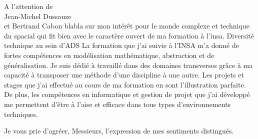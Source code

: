 \documentclass[12pt]{lettre}
\begin{document}
\begin{letter}{A l'attention de\\Jean-Michel Dussauze\\et Bertrand Cabon}
blabla sur mon intérêt pour le monde complexe et technique du spacial qui fit bien avec le caractère ouvert de ma formation à l'insa. Diversité technique au sein d'ADS
La formation que j'ai suivie à l'INSA m'a donné de fortes compétences en modélisation mathématique, abstraction et de généralisation. Je suis dédié à travaillé dans des domaines transverses grâce à ma capacité à transposer une méthode d'une discipline à une autre. Les projets et stages que j'ai effectué au cours de ma formation en sont l'illustration parfaite. De plus, les compétences en informatique et gestion de projet que j'ai développé me permettent d'être à l'aise et efficace dans tous types d'environnements techniques.%

\closing{Je vous prie d'agréer, Messieurs, l'expression de mes sentiments distingués.}
\end{letter}
\end{document}
